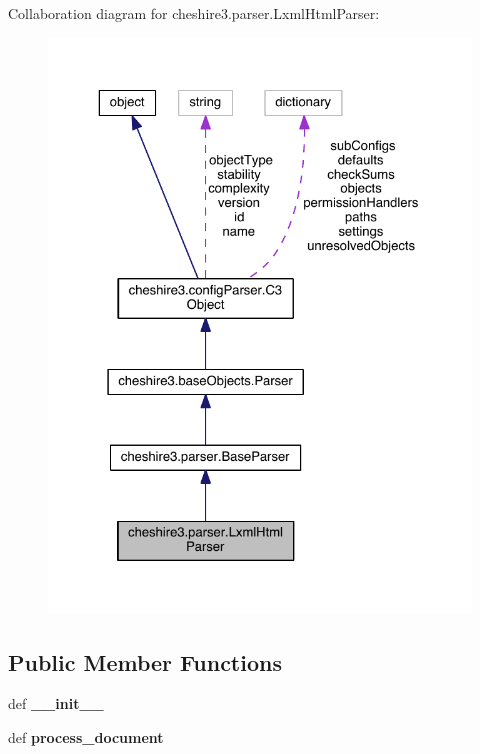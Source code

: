 Collaboration diagram for cheshire3.\-parser.\-Lxml\-Html\-Parser\-:
\nopagebreak
\begin{figure}[H]
\begin{center}
\leavevmode
\includegraphics[width=325pt]{classcheshire3_1_1parser_1_1_lxml_html_parser__coll__graph}
\end{center}
\end{figure}
\subsection*{Public Member Functions}
\begin{DoxyCompactItemize}
\item 
\hypertarget{classcheshire3_1_1parser_1_1_lxml_html_parser_a85c20f7df5848b96899f32bd76ec1aff}{def {\bfseries \-\_\-\-\_\-init\-\_\-\-\_\-}}\label{classcheshire3_1_1parser_1_1_lxml_html_parser_a85c20f7df5848b96899f32bd76ec1aff}

\item 
\hypertarget{classcheshire3_1_1parser_1_1_lxml_html_parser_a20862e4ee6f2347cab16691ca8ea06e8}{def {\bfseries process\-\_\-document}}\label{classcheshire3_1_1parser_1_1_lxml_html_parser_a20862e4ee6f2347cab16691ca8ea06e8}

\end{DoxyCompactItemize}
